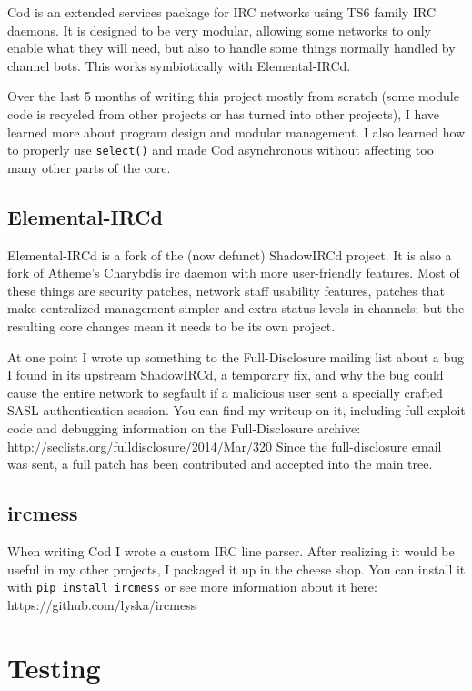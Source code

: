 \documentclass[twocolumn]{article}
\begin{document}
Cod is an extended services package for IRC networks using TS6 family IRC daemons. It is designed to be very modular, allowing some networks to only enable what they will need, but also to handle some things normally handled by channel bots. This works symbiotically with Elemental-IRCd.

Over the last 5 months of writing this project mostly from scratch (some module code is recycled from other projects or has turned into other projects), I have learned more about program design and modular management. I also learned how to properly use \texttt{select()} and made Cod asynchronous without affecting too many other parts of the core.

\subsection{Elemental-IRCd}

Elemental-IRCd is a fork of the (now defunct) ShadowIRCd project. It is also a fork of Atheme's Charybdis irc daemon with more user-friendly features. Most of these things are security patches, network staff usability features, patches that make centralized management simpler and extra status levels in channels; but the resulting core changes mean it needs to be its own project.

At one point I wrote up something to the Full-Disclosure mailing list about a bug I found in its upstream ShadowIRCd, a temporary fix, and why the bug could cause the entire network to segfault if a malicious user sent a specially crafted SASL authentication session. You can find my writeup on it, including full exploit code and debugging information on the Full-Disclosure archive: http://seclists.org/fulldisclosure/2014/Mar/320 Since the full-disclosure email was sent, a full patch has been contributed and accepted into the main tree.

\subsection{ircmess}

When writing Cod I wrote a custom IRC line parser. After realizing it would be useful in my other projects, I packaged it up in the cheese shop. You can install it with \texttt{pip install ircmess} or see more information about it here: https://github.com/lyska/ircmess

\section{Testing}
\end{document}
